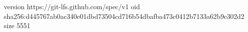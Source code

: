 version https://git-lfs.github.com/spec/v1
oid sha256:d445767ab0ac340e01dbd73504cd716b54dbafba473c0412b7133a62b9c302d2
size 5551
